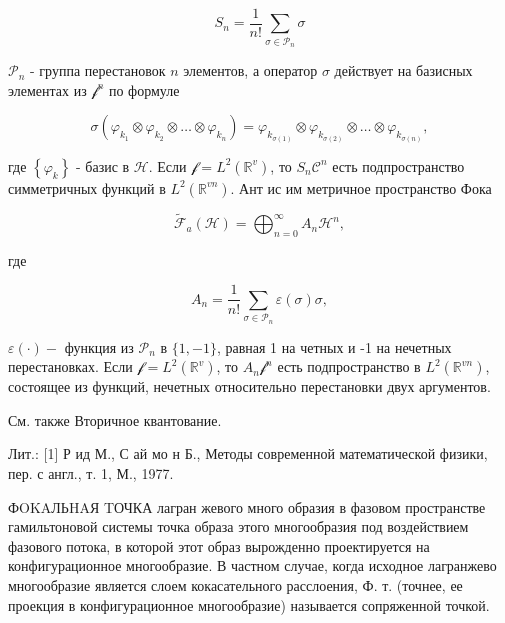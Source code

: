 \documentclass[10pt]{article}
\begin{document}
\[

S_{n}=\frac{1}{n !} \sum_{\sigma \in \mathscr{P}_{n}} \sigma

\]



$\mathscr{P}_{n}$ - группа перестановок $n$ элементов, а оператор $\sigma$ действует на базисных элементах из $\mathscr{f}^{n}$ по формуле



\[

\sigma\left(\varphi_{k_{1}} \otimes \varphi_{k_{2}} \otimes \ldots \otimes \varphi_{k_{n}}\right)=\varphi_{k_{\sigma(1)}} \otimes \varphi_{k_{\sigma(2)}} \otimes \ldots \otimes \varphi_{k_{\sigma(n)}},

\]



где $\left\{\varphi_{k}\right\}$ - базис в $\mathscr{H}$. Если $\mathscr{f}=L^{2}\left(\mathbb{R}^{v}\right)$, то $S_{n} \mathscr{C}^{n}$ есть подпространство симметричных функций в $L^{2}\left(\mathbb{R}^{v n}\right)$. Ант ис им метричное пространство Фока



\[

\widetilde{\mathscr{F}}_{a}(\mathscr{H})=\bigoplus_{n=0}^{\infty} A_{n} \mathscr{H}^{n},

\]



где



\[

A_{n}=\frac{1}{n !} \sum_{\sigma \in \mathscr{P}_{n}} \varepsilon(\sigma) \sigma,

\]



$\varepsilon(\cdot)-$ функция из $\mathscr{P}_{n}$ в $\{1,-1\}$, равная 1 на четных и -1 на нечетных перестановках. Если $\mathscr{f}=L^{2}\left(\mathbb{R}^{v}\right)$, то $A_{n} \mathscr{f}^{n}$ есть подпространство в $L^{2}\left(\mathbb{R}^{v n}\right)$, состоящее из функций, нечетных относительно перестановки двух аргументов.



См. также Вторичное квантование.



Лит.: [1] Р ид М., С ай мо н Б., Методы современной математической физики, пер. с англ., т. 1, М., 1977.



ФOKAЛЬHAЯ TОЧКА лагран жевого много образия в фазовом пространстве гамильтоновой системы точка образа этого многообразия под воздействием фазового потока, в которой этот образ вырожденно проектируется на конфигурационное многообразие. В частном случае, когда исходное лагранжево многообразие является слоем кокасательного расслоения, Ф. т. (точнее, ее проекция в конфигурационное многообразие) называется сопряженной точкой.
\end{document}
